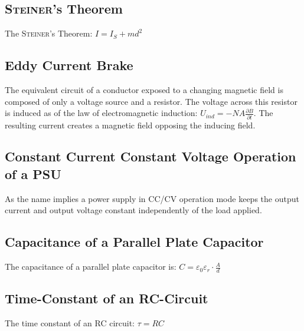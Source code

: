     \subsection*{\textsc{Steiner}'s Theorem}
        The \textsc{Steiner}'s Theorem: \(I = I_S + md^2\)
    \subsection*{Eddy Current Brake}
        The equivalent circuit of a conductor exposed to a changing magnetic field is composed of only a voltage source
        and a resistor. The voltage across this resistor is induced as of the law of electromagnetic induction: \(U_{ind} = -NA\frac{\partial B}{\partial t}\).
        The resulting current creates a magnetic field opposing the inducing field.
    \subsection*{Constant Current Constant Voltage Operation of a PSU}
        As the name implies a power supply in CC/CV operation mode keeps the output current and output voltage constant
        independently of the load applied.
    \subsection*{Capacitance of a Parallel Plate Capacitor}
        The capacitance of a parallel plate capacitor is: \(C = \varepsilon_0 \varepsilon_r \cdot \frac{A}{d}\)
    \subsection*{Time-Constant of an RC-Circuit}
        The time constant of an RC circuit: \(\tau = RC\)
